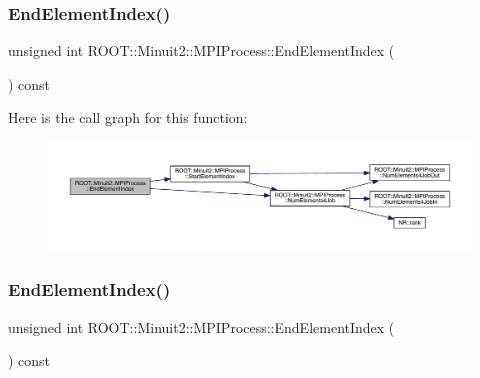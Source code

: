 \subsubsection{\texorpdfstring{EndElementIndex()}{EndElementIndex()}\hspace{0.1cm}{\footnotesize\ttfamily [2/3]}}
{\footnotesize\ttfamily unsigned int R\+O\+O\+T\+::\+Minuit2\+::\+M\+P\+I\+Process\+::\+End\+Element\+Index (\begin{DoxyParamCaption}{ }\end{DoxyParamCaption}) const\hspace{0.3cm}{\ttfamily [inline]}}

Here is the call graph for this function\+:
\nopagebreak
\begin{figure}[H]
\begin{center}
\leavevmode
\includegraphics[width=350pt]{dc/d43/classROOT_1_1Minuit2_1_1MPIProcess_af4445148831dec4961d5f8aa99aeb2c1_cgraph}
\end{center}
\end{figure}
\mbox{\label{classROOT_1_1Minuit2_1_1MPIProcess_af4445148831dec4961d5f8aa99aeb2c1}} 
\subsubsection{\texorpdfstring{EndElementIndex()}{EndElementIndex()}\hspace{0.1cm}{\footnotesize\ttfamily [3/3]}}
{\footnotesize\ttfamily unsigned int R\+O\+O\+T\+::\+Minuit2\+::\+M\+P\+I\+Process\+::\+End\+Element\+Index (\begin{DoxyParamCaption}{ }\end{DoxyParamCaption}) const\hspace{0.3cm}{\ttfamily [inline]}}

